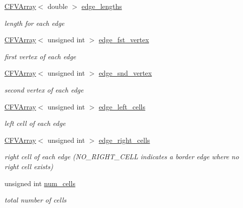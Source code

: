 \begin{DoxyCompactItemize}
\hyperlink{classFVL_1_1CFVArray}{CFVArray}$<$ double $>$ \hyperlink{classFVL_1_1CFVMesh2D_aebae766e252c936bed264b8ff3c9523d}{edge\_\-lengths}
\begin{DoxyCompactList}\small\item\em length for each edge \item\end{DoxyCompactList}\item 
\hyperlink{classFVL_1_1CFVArray}{CFVArray}$<$ unsigned int $>$ \hyperlink{classFVL_1_1CFVMesh2D_a21b745a28be501c6f6e79d4cef3ef779}{edge\_\-fst\_\-vertex}
\begin{DoxyCompactList}\small\item\em first vertex of each edge \item\end{DoxyCompactList}\item 
\hyperlink{classFVL_1_1CFVArray}{CFVArray}$<$ unsigned int $>$ \hyperlink{classFVL_1_1CFVMesh2D_a68d5bdf0974c1e9c24b511c6e3801664}{edge\_\-snd\_\-vertex}
\begin{DoxyCompactList}\small\item\em second vertex of each edge \item\end{DoxyCompactList}\item 
\hyperlink{classFVL_1_1CFVArray}{CFVArray}$<$ unsigned int $>$ \hyperlink{classFVL_1_1CFVMesh2D_a9fc942016b70da68970d941850fc4328}{edge\_\-left\_\-cells}
\begin{DoxyCompactList}\small\item\em left cell of each edge \item\end{DoxyCompactList}\item 
\hyperlink{classFVL_1_1CFVArray}{CFVArray}$<$ unsigned int $>$ \hyperlink{classFVL_1_1CFVMesh2D_a99a2c529d96512148f33c07cae218825}{edge\_\-right\_\-cells}
\begin{DoxyCompactList}\small\item\em right cell of each edge (NO\_\-RIGHT\_\-CELL indicates a border edge where no right cell exists) \item\end{DoxyCompactList}\item 
unsigned int \hyperlink{classFVL_1_1CFVMesh2D_aede6f897b05f909a426f36f61b2b8d43}{num\_\-cells}
\begin{DoxyCompactList}\small\item\em total number of cells \item\end{DoxyCompactList}\item 

\end{DoxyCompactItemize}
